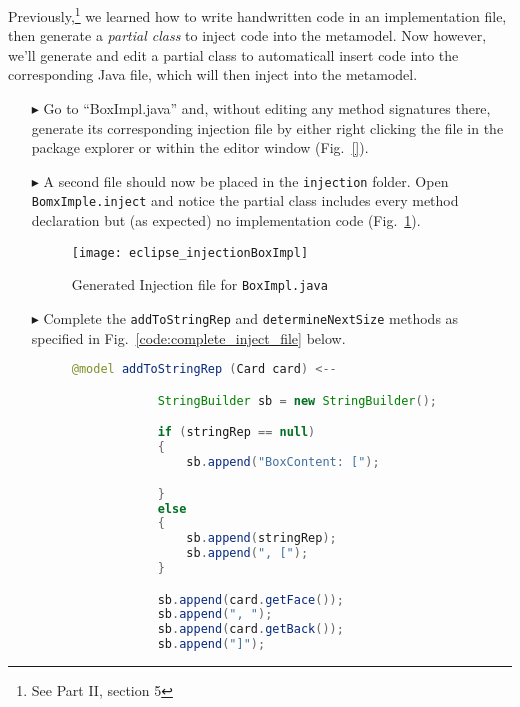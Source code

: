 
Previously,\footnote{See Part II, section 5} we learned how to write handwritten code in an implementation file, then generate
a \emph{partial class} to inject code into the metamodel. Now however, we'll generate and edit a partial class to automaticall insert code into the
corresponding Java file, which will then inject into the metamodel.

\begin{itemize}

\item[$\blacktriangleright$] Go to ``BoxImpl.java'' and, without editing any method signatures there, generate its corresponding injection file by either right
clicking the file in the package explorer or within the editor window (Fig.~\ref{}).

\item[$\blacktriangleright$] A second file should now be placed in the \texttt{injection} folder. Open \texttt{BomxImple.inject} and notice the
partial class includes every method declaration but (as expected) no implementation code (Fig.~\ref{fig:injection_partialClassBox}).

\begin{figure}[htbp]
    \centering
    \texttt{[image: eclipse\_injectionBoxImpl]}
    \caption{Generated Injection file for \texttt{BoxImpl.java}}
    \label{fig:injection_partialClassBox}
\end{figure}

\item[$\blacktriangleright$] Complete the \texttt{addToStringRep} and \texttt{determineNextSize} methods as specified in Fig.~\ref{code:complete_inject_file}
below.

\vspace{0.5cm}

\begin{figure}[htbp]
        \centering
        \begin{lstlisting}[language=Java, keywordstyle={\bfseries\color{purple}}, backgroundcolor=\color{white}]
    @model addToStringRep (Card card) <--

            StringBuilder sb = new StringBuilder();

            if (stringRep == null)
            {
                sb.append("BoxContent: [");

            }
            else
            {
                sb.append(stringRep);
                sb.append(", [");
            }

            sb.append(card.getFace());
            sb.append(", ");
            sb.append(card.getBack());
            sb.append("]");


\end{lstlisting}
\end{figure}
\end{itemize}
